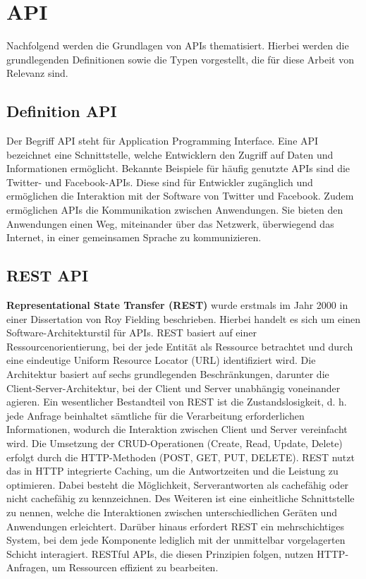 
\section{API} %
\label{sec:apigrundlagen}
Nachfolgend werden die Grundlagen von APIs thematisiert. Hierbei werden die grundlegenden Definitionen sowie die Typen vorgestellt, die für diese Arbeit von Relevanz sind.
\subsection{Definition API} %
\label{sec:grundlegendedefinitionvonapi}
Der Begriff \glqq API\grqq{}  steht für \glqq Application Programming Interface\grqq{}. Eine API bezeichnet eine Schnittstelle, welche Entwicklern den Zugriff auf Daten und Informationen ermöglicht. Bekannte Beispiele für häufig genutzte APIs sind die Twitter- und Facebook-APIs. Diese sind für Entwickler zugänglich und ermöglichen die Interaktion mit der Software von Twitter und Facebook. Zudem ermöglichen APIs die Kommunikation zwischen Anwendungen. Sie bieten den Anwendungen einen Weg, miteinander über das Netzwerk, überwiegend das Internet, in einer gemeinsamen Sprache zu kommunizieren. \citep{apistrategyguide}
\newpage
\subsection{REST API} %
\label{sec:restapi}
 \textbf{Representational State Transfer (REST)} wurde erstmals im Jahr 2000 in einer Dissertation von Roy Fielding beschrieben. Hierbei handelt es sich um einen Software-Architekturstil für APIs. REST basiert auf einer Ressourcenorientierung, bei der jede Entität als Ressource betrachtet und durch eine eindeutige Uniform Resource Locator (URL) identifiziert wird. Die Architektur basiert auf sechs grundlegenden Beschränkungen, darunter die Client-Server-Architektur, bei der Client und Server unabhängig voneinander agieren. Ein wesentlicher Bestandteil von REST ist die Zustandslosigkeit, d. h. jede Anfrage beinhaltet sämtliche für die Verarbeitung erforderlichen Informationen, wodurch die Interaktion zwischen Client und Server vereinfacht wird. Die Umsetzung der CRUD-Operationen (Create, Read, Update, Delete) erfolgt durch die HTTP-Methoden (POST, GET, PUT, DELETE). REST nutzt das in HTTP integrierte Caching, um die Antwortzeiten und die Leistung zu optimieren. Dabei besteht die Möglichkeit, Serverantworten als cachefähig oder nicht cachefähig zu kennzeichnen. Des Weiteren ist eine einheitliche Schnittstelle zu nennen, welche die Interaktionen zwischen unterschiedlichen Geräten und Anwendungen erleichtert. Darüber hinaus erfordert REST ein mehrschichtiges System, bei dem jede Komponente lediglich mit der unmittelbar vorgelagerten Schicht interagiert. RESTful APIs, die diesen Prinzipien folgen, nutzen HTTP-Anfragen, um Ressourcen effizient zu bearbeiten. \citep{Fielding2000}  \citep{graphqlreplacerest}




